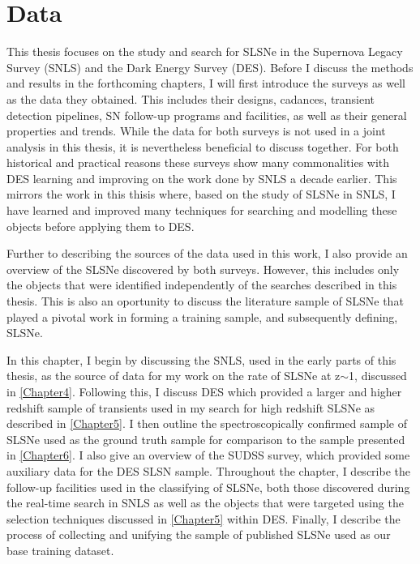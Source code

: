 \chapter{Data}
\label{Chapter2}

This thesis focuses on the study and search for SLSNe in the Supernova Legacy Survey (SNLS) and the Dark Energy Survey (DES). Before I discuss the methods and results in the forthcoming chapters, I will first introduce the surveys as well as the data they obtained. This includes their designs, cadances, transient detection pipelines, SN follow-up programs and facilities, as well as their general properties and trends. While the data for both surveys is not used in a joint analysis in this thesis, it is nevertheless beneficial to discuss together. For both historical and practical reasons these surveys show many commonalities with DES learning and improving on the work done by SNLS a decade earlier. This mirrors the work in this thisis where, based on the study of SLSNe in SNLS, I have learned and improved many techniques for searching and modelling these objects before applying them to DES.

Further to describing the sources of the data used in this work, I also provide an overview of the SLSNe discovered by both surveys. However, this includes only the objects that were identified independently of the searches described in this thesis. This is also an oportunity to discuss the literature sample of SLSNe that played a pivotal work in forming a training sample, and subsequently defining, SLSNe.

In this chapter, I begin by discussing the SNLS, used in the early parts of this thesis, as the source of data for my work on the rate of SLSNe at z$\sim$1, discussed in \cref{Chapter4}. Following this, I discuss DES which provided a larger and higher redshift sample of transients used in my search for high redshift SLSNe as described in \cref{Chapter5}. I then outline the spectroscopically confirmed sample of SLSNe used as the ground truth sample for comparison to the sample presented in \cref{Chapter6}. I also give an overview of the SUDSS survey, which provided some auxiliary data for the DES SLSN sample. Throughout the chapter, I describe the follow-up facilities used in the classifying of SLSNe, both those discovered during the real-time search in SNLS as well as the objects that were targeted using the selection techniques discussed in \cref{Chapter5} within DES. Finally, I describe the process of collecting and unifying the sample of published SLSNe used as our base training dataset.

